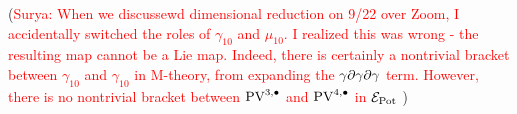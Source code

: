 \documentclass[11pt]{article}
\newcommand{\surya}[1]{(\textcolor{red}{Surya: #1})}
\begin{document}
\surya{ When we discussewd dimensional reduction on 9/22 over Zoom, I accidentally switched the roles of $\gamma_{10}$ and $\mu_{10}$. I realized this was wrong - the resulting map cannot be a Lie map. Indeed, there is certainly a nontrivial bracket between $\gamma_{10}$ and $\gamma_{10}$ in M-theory, from expanding the $\gamma\partial\gamma\partial\gamma$ term. However, there is no nontrivial bracket between $\text{PV}^{3,\bullet}$ and $\text{PV}^{4,\bullet}$ in $\mathcal{E}_{\rm Pot}$ }
\end{document}
